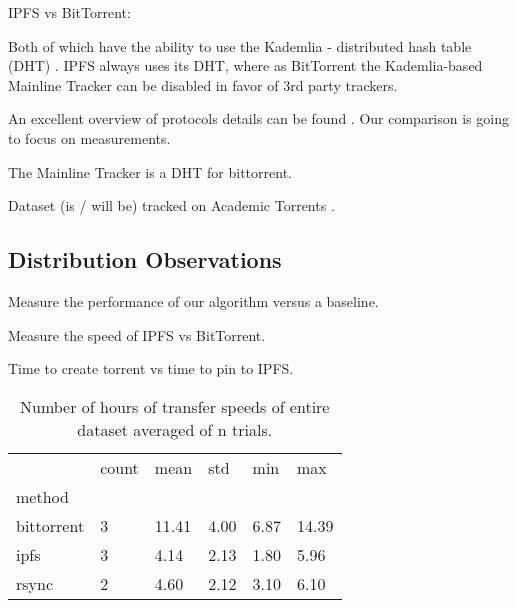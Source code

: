 \documentclass[10pt,twocolumn,letterpaper]{article}
\begin{document}
IPFS vs BitTorrent:

Both of which have the ability to use the Kademlia - distributed hash table (DHT) \cite{maymounkov_kademlia_2002}.
IPFS always uses its DHT, where as BitTorrent the Kademlia-based Mainline
Tracker can be disabled in favor of 3rd party trackers.

An excellent overview of protocols details can be found \cite{zebedee_comparing_2023}.
Our comparison is going to focus on measurements.



The Mainline Tracker is a DHT for bittorrent.



Dataset (is / will be) tracked on Academic Torrents \cite{academic_torrents_Cohen2014}.


\subsection{Distribution Observations}

Measure the performance of our algorithm versus a baseline.

Measure the speed of IPFS vs BitTorrent.

Time to create torrent vs time to pin to IPFS.


\begin{table}[t]
\begin{tabular}{llllll}
\toprule
{} & count &   mean &    std &   min &    max \\
method        &       &        &        &       &        \\
\midrule
bittorrent & 3 & 11.41 & 4.00 & 6.87 & 14.39 \\
ipfs & 3 & 4.14 & 2.13 & 1.80 & 5.96 \\
rsync & 2 & 4.60 & 2.12 & 3.10 & 6.10 \\
\bottomrule
\end{tabular}
\caption[]{
    Number of hours of transfer speeds of entire dataset averaged of n trials.
}
\end{table}
\end{document}
